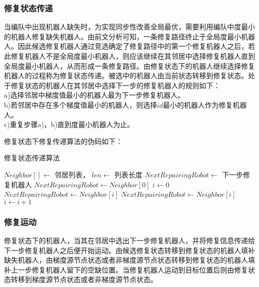 \subsubsection{修复状态传递}
当编队中出现机器人缺失时，为实现同步性改善全局最优，需要利用编队中度最小的机器人修复缺失机器人。由前文分析可知，一条修复路径终止于全局度最小机器人。因此候选修复机器人通过竞选确定了修复路径中的第一个修复机器人之后，若此修复机器人不是全局度最小机器人，则应该继续在其邻居中选择修复机器人直到全局度最小机器人，从而形成一条修复路径。由修复状态下的机器人继续选择修复机器人的过程称为修复状态传递。被选中的机器人由当前状态转移到修复状态。处于修复状态的机器人在其邻居中选择下一步的修复机器人的规则如下：\\
\indent a)选择邻居中梯度值最小的机器人最为下一步修复机器人。\\
\indent b)若邻居中存在多个梯度值最小的机器人，则选择$id$最小的机器人作为修复机器人。\\
\indent c)重复步骤a)，b)直到度最小机器人为止。

修复状态下修复传递算法的伪码如下：\\
\begin{algorithm}
	\caption{修复状态传递算法}
	\label{algorithm:repairing_status_deliever}
	\begin{algorithmic}[1]
		\Require $Neighbor[] \leftarrow$ 邻居列表， $len \leftarrow$ 列表长度
		\Ensure $NextRepairingRobot \leftarrow$ 下一步修复机器人
			\State $NextRepairingRobot \gets Neighbor[0]$
			\State $i \gets 0$
					\State $NextRepairingRobot \gets Neighbor[i]$
				\Else
						\State $NextRepairingRobot \gets Neighbor[i]$
					\EndIf
				\EndIf
				\State $i \gets i+1$
			\EndWhile
			\State {}
		\EndFunction			
	\end{algorithmic}	
\end{algorithm}
	
\subsubsection{修复运动}
修复状态下的机器人，当其在邻居中选出下一步修复机器人，并将修复信息传递给下一步修复机器人之后便开始运动。由候选修复状态转移到修复状态的机器人填补缺失机器人，由梯度源节点状态或者非梯度源节点状态转移到修复状态的机器人填补上一步修复机器人留下的空缺位置。当修复机器人运动到目标位置后则由修复状态转移到梯度源节点状态或者非梯度源节点状态。

